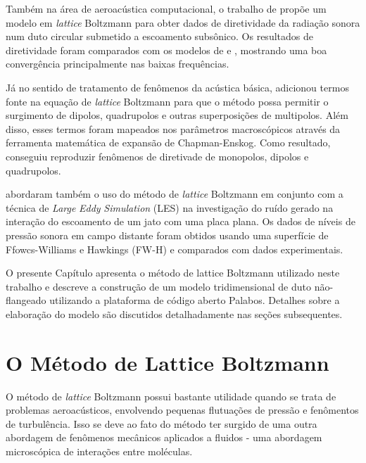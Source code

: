 Também na área de aeroacústica computacional, o trabalho de  propõe um modelo em \textit{lattice} Boltzmann para obter dados de diretividade da radiação sonora num duto circular submetido a escoamento subsônico. Os resultados de diretividade foram comparados com os modelos de  e , mostrando uma boa convergência principalmente nas baixas frequências.

Já no sentido de tratamento de fenômenos da acústica básica,  adicionou termos fonte na equação de \textit{lattice} Boltzmann para que o método possa permitir o surgimento de dipolos, quadrupolos e outras superposições de multipolos. Além disso, esses termos foram mapeados nos parâmetros macroscópicos através da ferramenta matemática de expansão de Chapman-Enskog. Como resultado, conseguiu reproduzir fenômenos de diretivade de monopolos, dipolos e quadrupolos.

 abordaram também o uso do método de \textit{lattice} Boltzmann em conjunto com a técnica de \textit{Large} \textit{Eddy} \textit{Simulation} (LES) na investigação do ruído gerado na interação do escoamento de um jato com uma placa plana. Os dados de níveis de pressão sonora em campo distante foram obtidos usando uma superfície de Ffowcs-Williams e Hawkings (FW-H) e comparados com dados experimentais.

O presente Capítulo apresenta o método de lattice Boltzmann utilizado neste trabalho e descreve a construção de um modelo tridimensional de duto não-flangeado utilizando a plataforma de código aberto Palabos. Detalhes sobre a elaboração do modelo são discutidos detalhadamente nas seções subsequentes.

\section{O Método de Lattice Boltzmann}

O método de \textit{lattice} Boltzmann possui bastante utilidade quando se trata de problemas aeroacústicos, envolvendo pequenas flutuações de pressão e fenômentos de turbulência. Isso se deve ao fato do método ter surgido de uma outra abordagem de fenômenos mecânicos aplicados a fluidos - uma abordagem microscópica de interações entre moléculas.


